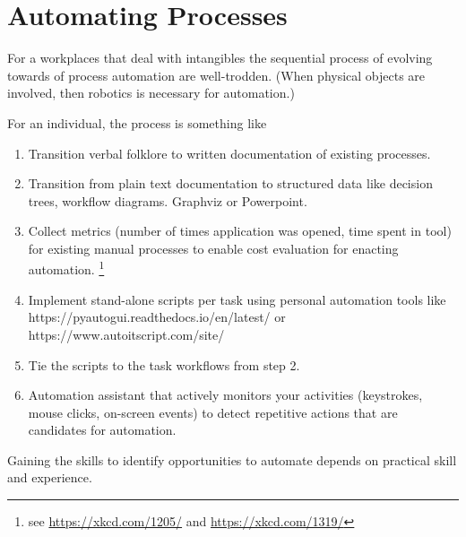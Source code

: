 \section{Automating Processes}


For a workplaces that deal with intangibles the sequential process of evolving towards of process automation are well-trodden.  (When physical objects are involved, then robotics is necessary for automation.)



For an individual, the process is something like
\begin{enumerate}
    \item Transition verbal folklore to written documentation of existing processes.
    \item Transition from plain text documentation to structured data like decision trees, workflow diagrams. Graphviz or Powerpoint.
    \item Collect metrics (number of times application was opened, time spent in tool) for existing manual processes to enable cost evaluation for enacting automation. \footnote{see \href{https://xkcd.com/1205/}{https://xkcd.com/1205/} and \href{https://xkcd.com/1319/}{https://xkcd.com/1319/}}
    \item Implement stand-alone scripts per task using personal automation tools like https://pyautogui.readthedocs.io/en/latest/ or https://www.autoitscript.com/site/
    \item Tie the scripts to the task workflows from step 2.
    \item Automation assistant that actively monitors your activities (keystrokes, mouse clicks, on-screen events) to detect repetitive actions that are candidates for automation.
\end{enumerate}

Gaining the skills to identify opportunities to automate depends on practical skill and experience.


